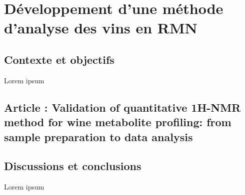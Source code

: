 \chapter{Développement d'une méthode d'analyse des vins en RMN}\label{chap:method}

\section{Contexte et objectifs}

Lorem ipsum 

\section{Article : Validation of quantitative 1H-NMR method for wine metabolite profiling: from sample preparation to data analysis} %

%

\section{Discussions et conclusions}

Lorem ipsum